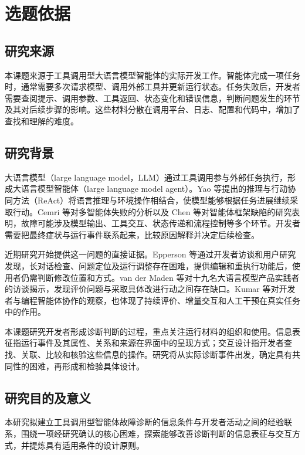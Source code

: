 \label{chap:selection-report}

\section{选题依据}

\subsection{研究来源}

本课题来源于工具调用型大语言模型智能体的实际开发工作。智能体完成一项任务时，通常需要多次请求模型、调用外部工具并更新运行状态。任务失败后，开发者需要查阅提示、调用参数、工具返回、状态变化和错误信息，判断问题发生的环节及其对后续步骤的影响。这些材料分散在调用平台、日志、配置和代码中，增加了查找和理解的难度。

\subsection{研究背景}

大语言模型（large language model，LLM）通过工具调用参与外部任务执行，形成大语言模型智能体（large language model agent）。Yao 等\cite{yao2023react}提出的推理与行动协同方法（ReAct）将语言推理与环境操作相结合，使模型能够根据任务进展继续采取行动。Cemri 等\cite{cemri2025mast}对多智能体失败的分析以及 Chen 等\cite{ref20}对智能体框架缺陷的研究表明，故障可能涉及模型输出、工具交互、状态传递和流程控制等多个环节。开发者需要把最终症状与运行事件联系起来，比较原因解释并决定后续检查。

近期研究开始提供这一问题的直接证据。Epperson 等\cite{ref02}通过开发者访谈和用户研究发现，长对话检查、问题定位及运行调整存在困难，提供编辑和重执行功能后，使用者仍需判断修改位置和方式。van der Maden 等\cite{ref01}对十九名大语言模型产品实践者的访谈揭示，发现评价问题与采取具体改进行动之间存在缺口。Kumar 等\cite{ref59}对开发者与编程智能体协作的观察，也体现了持续评价、增量交互和人工干预在真实任务中的作用。

本课题研究开发者形成诊断判断的过程，重点关注运行材料的组织和使用。信息表征指运行事件及其属性、关系和来源在界面中的呈现方式；交互设计指开发者查找、关联、比较和核验这些信息的操作。研究将从实际诊断事件出发，确定具有共同性的困难，再形成和检验具体设计。

\subsection{研究目的及意义}

本研究拟建立工具调用型智能体故障诊断的信息条件与开发者活动之间的经验联系，围绕一项经研究确认的核心困难，探索能够改善诊断判断的信息表征与交互方式，并提炼具有适用条件的设计原则。

